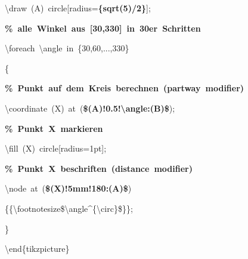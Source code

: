 {{\rule[-0.5ex]{0pt}{2.5ex}\hspace*{1.0em}\textbackslash{}draw~(A)~circle[radius=\textcolor{R}{\textbf{\{sqrt(5)/2\}}}];\\
\rule[-0.5ex]{0pt}{2.5ex}\hspace*{1.0em}\textcolor{G}{\textbf{\%~alle~Winkel~aus~[30,330]~in~30er~Schritten}}\\
\rule[-0.5ex]{0pt}{2.5ex}\hspace*{1.0em}\textbackslash{}foreach~\textbackslash{}angle~in~\{30,60,...,330\}\\
\rule[-0.5ex]{0pt}{2.5ex}\hspace*{1.0em}\{\\
\rule[-0.5ex]{0pt}{2.5ex}\hspace*{2.0em}\textcolor{G}{\textbf{\%~Punkt~auf~dem~Kreis~berechnen~(partway~modifier)}}\\
\rule[-0.5ex]{0pt}{2.5ex}\hspace*{2.0em}\textbackslash{}coordinate~(X)~at~(\textcolor{R}{\textbf{\$(A)!0.5!\textbackslash{}angle:(B)\$}});\\
\rule[-0.5ex]{0pt}{2.5ex}\hspace*{2.0em}\textcolor{G}{\textbf{\%~Punkt~X~markieren}}\\
\rule[-0.5ex]{0pt}{2.5ex}\hspace*{2.0em}\textbackslash{}fill~(X)~circle[radius=1pt];\\
\rule[-0.5ex]{0pt}{2.5ex}\hspace*{2.0em}\textcolor{G}{\textbf{\%~Punkt~X~beschriften~(distance~modifier)}}\\
\rule[-0.5ex]{0pt}{2.5ex}\hspace*{2.0em}\textbackslash{}node~at~(\textcolor{R}{\textbf{\$(X)!5mm!180:(A)\$}})\\
\rule[-0.5ex]{0pt}{2.5ex}\hspace*{6.5em}\{\{\textbackslash{}footnotesize\$\textbackslash{}angle\^{}\{\textbackslash{}circ\}\$\}\};\\
\rule[-0.5ex]{0pt}{2.5ex}\hspace*{1.0em}\}\\
\rule[-0.5ex]{0pt}{2.5ex}\hspace*{0.0em}\textbackslash{}end\{tikzpicture\}}%
}%
\endgroup
